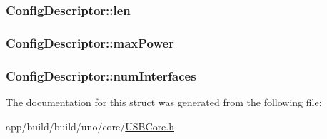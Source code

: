 \hypertarget{struct_config_descriptor_a968a7572b9ec082027df4c3073bbb007}{
\subsubsection[{len}]{ Config\-Descriptor\-::len}}\label{struct_config_descriptor_a968a7572b9ec082027df4c3073bbb007}
\hypertarget{struct_config_descriptor_a4f157a740d4f9c608d0ef137695aad70}{
\subsubsection[{max\-Power}]{ Config\-Descriptor\-::max\-Power}}\label{struct_config_descriptor_a4f157a740d4f9c608d0ef137695aad70}
\hypertarget{struct_config_descriptor_ab133b834940700d3f2d17400c5712135}{
\subsubsection[{num\-Interfaces}]{ Config\-Descriptor\-::num\-Interfaces}}\label{struct_config_descriptor_ab133b834940700d3f2d17400c5712135}


The documentation for this struct was generated from the following file\-:\begin{DoxyCompactItemize}
\item 
app/build/build/uno/core/\hyperlink{_u_s_b_core_8h}{U\-S\-B\-Core.\-h}\end{DoxyCompactItemize}
